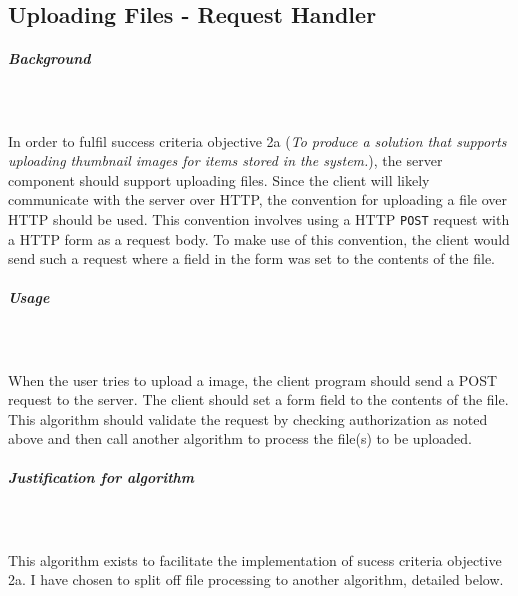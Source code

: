 \documentclass[../../main.tex]{subfiles}
\begin{document}
\begin{dummyenv}
    \setlength{\parindent}{0mm}
    \begin{minipage}[t]{1\linewidth}
        \paragraph{} %

        \subsection{Uploading Files - Request Handler}

        \subparagraph{Background}

        \noindent \\\\ In order to fulfil success criteria objective 2a (\textit{To produce a solution that supports
            uploading thumbnail images for items stored in the system.}), the server component should support uploading
        files. Since the client will likely communicate with the server over HTTP, the convention for uploading a file
        over HTTP should be used. This convention involves using a HTTP \lstinline{POST} request with a HTTP form as
        a request body. To make use of this convention, the client would send such a request where a field in the form
        was set to the contents of the file.\\

        \subparagraph{Usage}

        \noindent \\\\ When the user tries to upload a image, the client program should send a POST request to the
        server. The client should set a form field to the contents of the file. This algorithm should validate the
        request by checking authorization as noted above and then call another algorithm to process the file(s) to
        be uploaded.

    \end{minipage}
\end{dummyenv}

\subparagraph{Justification for algorithm}

\noindent \\\\ This algorithm exists to facilitate the implementation of sucess criteria objective 2a.
I have chosen to split off file processing to another algorithm, detailed below.

\pagebreak
\end{document}
